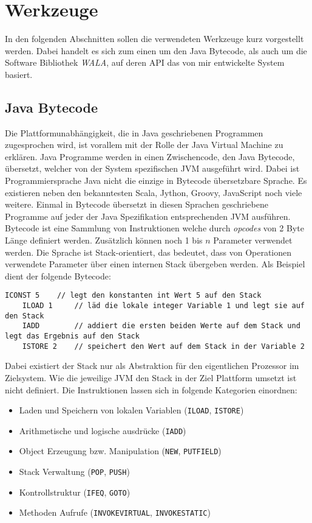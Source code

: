 \chapter{Werkzeuge}

In den folgenden Abschnitten sollen die verwendeten Werkzeuge kurz vorgestellt werden. Dabei handelt es sich zum einen um
den Java Bytecode, als auch um die Software Bibliothek \textit{WALA}, auf deren API das von mir entwickelte System 
basiert. 

\section{Java Bytecode}

Die Plattformunabhängigkeit, die in Java geschriebenen Programmen zugesprochen wird, ist vorallem mit der Rolle der Java 
Virtual Machine zu erklären. Java Programme werden in einen Zwischencode, den Java Bytecode, übersetzt, welcher von der 
System spezifischen JVM ausgeführt wird. Dabei ist Programmiersprache Java nicht die einzige in Bytecode übersetzbare 
Sprache. Es existieren neben den bekanntesten Scala, Jython, Groovy, JavaScript noch viele weitere. Einmal in Bytecode 
übersetzt in diesen Sprachen geschriebene Programme auf jeder der Java Spezifikation entsprechenden JVM ausführen. 
\\
Bytecode ist eine Sammlung von Instruktionen welche durch \textit{opcodes} von 2 Byte Länge definiert werden. Zusätzlich
können noch 1 bis $n$ Parameter verwendet werden. Die Sprache ist Stack-orientiert, das bedeutet, dass von Operationen 
verwendete Parameter über einen internen Stack übergeben werden. Als Beispiel dient der folgende Bytecode:

\begin{lstlisting}[language=bytecode]
	ICONST 5 	// legt den konstanten int Wert 5 auf den Stack 
	ILOAD 1		// läd die lokale integer Variable 1 und legt sie auf den Stack
	IADD 		// addiert die ersten beiden Werte auf dem Stack und legt das Ergebnis auf den Stack
	ISTORE 2	// speichert den Wert auf dem Stack in der Variable 2
\end{lstlisting} 

Dabei existiert der Stack nur als Abstraktion für den eigentlichen Prozessor im Zielsystem. Wie die jeweilige JVM den 
Stack in der Ziel Plattform umsetzt ist nicht definiert. Die Instruktionen lassen sich in folgende Kategorien einordnen:

\begin{itemize}
	\item Laden und Speichern von lokalen Variablen (\texttt{ILOAD}, \texttt{ISTORE})
	\item Arithmetische und logische ausdrücke (\texttt{IADD})
	\item Object Erzeugung bzw. Manipulation (\texttt{NEW}, \texttt{PUTFIELD})
	\item Stack Verwaltung (\texttt{POP}, \texttt{PUSH}) 
	\item Kontrollstruktur (\texttt{IFEQ}, \texttt{GOTO})
	\item Methoden Aufrufe (\texttt{INVOKEVIRTUAL}, \texttt{INVOKESTATIC})
\end{itemize}  


